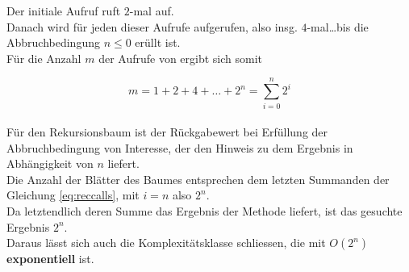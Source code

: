 \noindent
Der initiale Aufruf  ruft $2$-mal  auf.\\
Danach wird für jeden dieser Aufrufe  aufgerufen, also insg. $4$-mal\ldots bis die Abbruchbedingung $n \leq 0$ erüllt ist.\\
Für die Anzahl $m$ der Aufrufe von  ergibt sich somit


\begin{equation}
     m = 1 + 2 + 4 + \dots + 2^n = \sum_{i=0}^n 2^i
    \label{eq:reccalls}
\end{equation}\\

\noindent
Für den Rekursionsbaum ist der Rückgabewert bei Erfüllung der Abbruchbedingung von Interesse, der den Hinweis zu dem Ergebnis in Abhängigkeit von $n$ liefert.\\
Die Anzahl der Blätter des Baumes entsprechen dem letzten Summanden der Gleichung \ref{eq:reccalls}, mit $i=n$
also $2^n$.\\
Da letztendlich deren Summe das Ergebnis der Methode  liefert, ist das gesuchte Ergebnis $2^n$.\\

\noindent
Daraus lässt sich auch die Komplexitätsklasse schliessen, die mit $O(2^n)$ \textbf{exponentiell} ist.

